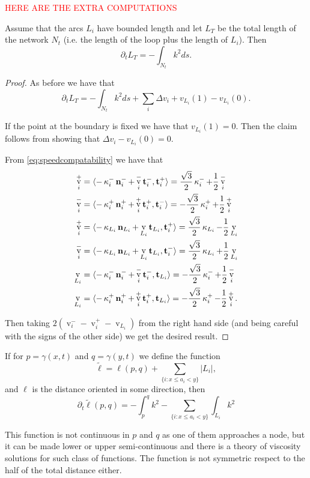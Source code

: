 \documentclass[11pt]{amsart}
\DeclareMathOperator{\tangspeed}{v}
\begin{document}
\textcolor{red}{HERE ARE THE EXTRA COMPUTATIONS}
\begin{lemma}
Assume that the arcs $L_i$ have bounded length and let
$L_T$ be the
total length of the network $N_t$ (i.e.
 the length of the loop plus the length of $L_i$). Then 
  $$\partial_t L_T=-\int_{N_t}k^2 ds.$$


\begin{proof}
As before we have that
$$\partial_t L_T=-\int_{N_t}k^2 ds+\sum_i \Delta v_i + v_{L_i}(1)-v_{L_i}(0).$$

If the point at the boundary is fixed we have that $v_{L_i}(1)=0$. 
Then the claim follows from showing that 
$\Delta v_i-v_{L_i}(0)=0$.

From \eqref{eq:speedcompatability}
we have that
\begin{align*}
\tangspeed_i^+ &= \ip{-\curvecurv_i^- \nor_i^- + \tangspeed_i^- \tang_i^-}{\tang_i^+} = \frac{\sqrt{3}}{2} \curvecurv_i^- + \frac{1}{2} \tangspeed_i^- \\
\tangspeed_i^- &= \ip{-\curvecurv_i^+ \nor_i^+ + \tangspeed_i^+ \tang_i^+}{\tang_i^-} = - \frac{\sqrt{3}}{2} \curvecurv_i^+ + \frac{1}{2} \tangspeed_i^+
\\
\tangspeed_i^+ &= \ip{-\curvecurv_{L_i} \nor_{L_i} + \tangspeed_{L_i} \tang_{L_i}}{\tang_i^+} = \frac{\sqrt{3}}{2} \curvecurv_{L_i} - \frac{1}{2} \tangspeed_{L_i}\\
\tangspeed_i^- &= \ip{-\curvecurv_{L_i} \nor_{L_i} + \tangspeed_{L_i} \tang_{L_i}}{\tang_i^-} =  \frac{\sqrt{3}}{2} \curvecurv_{L_i} + \frac{1}{2} \tangspeed_{L_i}\\
\tangspeed_{L_i} &= \ip{-\curvecurv_i^- \nor_i^- + \tangspeed_i^- \tang_i^-}{\tang_{L_i}} = - \frac{\sqrt{3}}{2} \curvecurv_i^- + \frac{1}{2} \tangspeed_i^-\\
\tangspeed_{L_i} &= \ip{-\curvecurv_i^+ \nor_i^+ + \tangspeed_i^+ \tang_i^+}{\tang_{L_i}} = - \frac{\sqrt{3}}{2} \curvecurv_i^+ - \frac{1}{2} \tangspeed_i^+.
\end{align*}

Then taking $2(\tangspeed_i^--
\tangspeed_i^+-\tangspeed_{L_i})$
from the right hand side (and being careful with the signs of the other side) we get the desired result.

\end{proof}
\end{lemma}
\begin{remark}
If for $p=\gamma(x,t)$ and $q=\gamma(y,t)$ we define the function 
$$\tilde{\ell}=\ell(p,q)+\sum_{\{i:x\leq a_i <y\}}|L_i|,$$
and $\ell$ is the distance oriented in some direction, then
$$\partial_t\tilde{\ell}(p,q)=-\int_p^qk^2- \sum_{\{i:x\leq a_i <y\}}\int_{L_i} k^2$$


This function is not continuous in $p$ and $q$ as one of them approaches a node, but it can be made lower or upper semi-continuous and there is a theory of viscosity solutions for such class of functions. The function is not symmetric respect to the half of the total distance either.
\end{remark}
\end{document}
